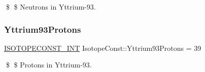 \$ \$ Neutrons in Yttrium-\/93. \mbox{\label{group___isotope_const-_yttrium-_y93_ga78e6d56cb8fbc0423fd77c2cee65ee7d}} 
\subsubsection{\texorpdfstring{Yttrium93\+Protons}{Yttrium93Protons}}
{\footnotesize\ttfamily \mbox{\hyperlink{group___isotope_const-_macros_ga5f18360b3e99483a35c32d789e62621c}{I\+S\+O\+T\+O\+P\+E\+C\+O\+N\+S\+T\+\_\+\+I\+NT}} Isotope\+Const\+::\+Yttrium93\+Protons = 39}

\$ \$ Protons in Yttrium-\/93. 